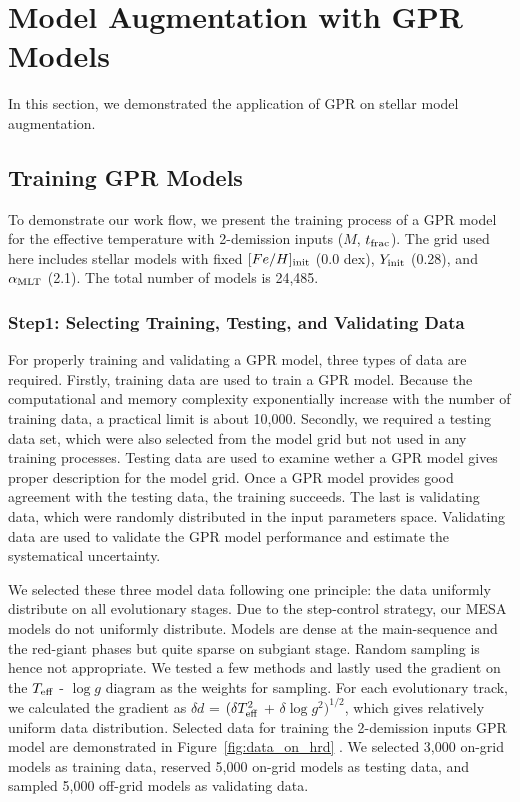 \section{Model Augmentation with GPR Models}\label{aug}
In this section, we demonstrated the application of GPR on stellar model augmentation.  

\subsection{Training GPR Models}

To demonstrate our work flow, we present the training process of a GPR model for the effective temperature with 2-demission inputs ($M$, $t_{\rm frac}$). The grid used here includes stellar models with fixed $[Fe/H]_{\rm init}$ (0.0 dex), $Y_{\rm init}$ (0.28), and $\alpha_{\rm MLT}$ (2.1). The total number of models is 24,485.  

\subsubsection{Step1: Selecting Training, Testing, and Validating Data}

For properly training and validating a GPR model, three types of data are required. Firstly, training data are used to train a GPR model. Because the computational and memory complexity exponentially increase with the number of training data, a practical limit is about 10,000. Secondly, we required a testing data set, which were also selected from the model grid but not used in any training processes. Testing data are used to examine wether a GPR model gives proper description for the model grid. Once a GPR model provides good agreement with the testing data, the training succeeds. The last is validating data, which were randomly distributed in the input parameters space. Validating data are used to validate the GPR model performance and estimate the systematical uncertainty.

We selected these three model data following one principle: the data uniformly distribute on all evolutionary stages. Due to the step-control strategy, our \textsc{MESA} models do not uniformly distribute. Models are dense at the main-sequence and the red-giant phases but quite sparse on subgiant stage. Random sampling is hence not appropriate. 
We tested a few methods and lastly used the gradient on the $T_{\rm eff}$ - $\log g$ diagram as the weights for sampling.  For each evolutionary track, we calculated the gradient as $\delta d$ = $(\delta T_{\rm eff}^{2}$ + $\delta \log g^{2})^{1/2}$, which gives relatively uniform data distribution. Selected data for training the 2-demission inputs GPR model are  demonstrated in Figure~\ref{fig:data_on_hrd} . We selected 3,000 on-grid models as training data, reserved 5,000 on-grid models as testing data, and sampled 5,000 off-grid models as validating data.

